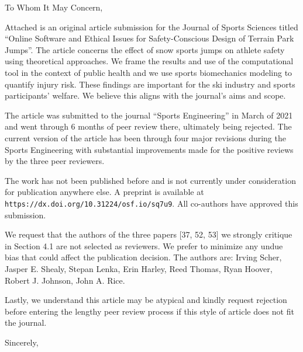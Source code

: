 \documentclass[en]{tuletter}
\date{October 5, 2021}
\begin{document}
\makeheader
\opening{To Whom It May Concern,}

Attached is an original article submission for the Journal of Sports Sciences
titled ``Online Software and Ethical Issues for Safety-Conscious Design of
Terrain Park Jumps''. The article concerns the effect of snow sports jumps on
athlete safety using theoretical approaches. We frame the results and use of
the computational tool in the context of public health and we use sports
biomechanics modeling to quantify injury risk. These findings are important for
the ski industry and sports participants' welfare. We believe this aligns with
the journal's aims and scope.

The article was submitted to the journal ``Sports Engineering'' in March of
2021 and went through 6 months of peer review there, ultimately being rejected.
The current version of the article has been through four major revisions during
the Sports Engineering with substantial improvements made for the positive
reviews by the three peer reviewers.

The work has not been published before and is not currently under consideration
for publication anywhere else. A preprint is available at
\verb|https://dx.doi.org/10.31224/osf.io/sq7u9|. All co-authors have approved
this submission.

We request that the authors of the three papers [37, 52, 53] we strongly
critique in Section 4.1 are not selected as reviewers. We prefer to minimize
any undue bias that could affect the publication decision. The authors are:
Irving Scher, Jasper E. Shealy, Stepan Lenka, Erin Harley, Reed Thomas, Ryan
Hoover, Robert J. Johnson, John A. Rice.

Lastly, we understand this article may be atypical and kindly request rejection
before entering the lengthy peer review process if this style of article does
not fit the journal.

\closing{Sincerely,}
\end{document}
